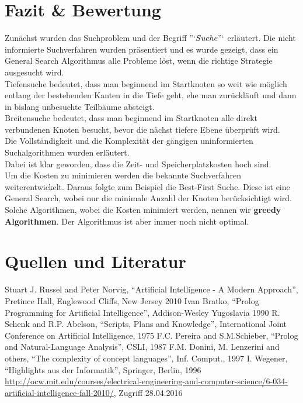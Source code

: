 \newpage
\section{Fazit \& Bewertung}

Zunächst wurden das Suchproblem und der Begriff $"`Suche"`$ erläutert. Die nicht informierte Suchverfahren wurden präsentiert und es wurde gezeigt, dass ein General Search Algorithmus alle Probleme löst, wenn die richtige Strategie ausgesucht wird. \\

Tiefensuche bedeutet, dass man beginnend im Startknoten so weit wie möglich entlang der bestehenden Kanten in die Tiefe geht, ehe man zurückläuft und dann in bislang unbesuchte Teilbäume absteigt.\\

 Breitensuche bedeutet, dass man beginnend im Startknoten alle direkt verbundenen Knoten besucht, bevor die nächst tiefere Ebene überprüft wird.\\

Die Vollständigkeit und die Komplexität der gängigen uninformierten Suchalgorithmen wurden erläutert.\\

Dabei ist klar geworden, dass die Zeit- und Speicherplatzkosten hoch sind. \\

Um die Kosten zu minimieren werden die bekannte Suchverfahren weiterentwickelt. Daraus folgte zum Beispiel die Best-First Suche. Diese ist eine General Search, wobei nur die minimale Anzahl der Knoten berücksichtigt wird.\\  Solche Algorithmen, wobei die Kosten minimiert werden, nennen wir \textbf{greedy Algorithmen}. Der Algorithmus ist aber immer noch nicht optimal.\\

\newpage
\section{Quellen und Literatur}

\begin{thebibliography}{999}
 Stuart J. Russel and Peter Norvig, “Artificial Intelligence - A Modern Approach”, Pretince Hall, Englewood Cliffs, New Jersey 2010
 Ivan Bratko, “Prolog Programming for Artificial Intelligence”, Addison-Wesley Yugoslavia 1990
 R. Schenk and R.P. Abelson, “Scripts, Plans and Knowledge”, International Joint Conference on Artificial Intelligence, 1975
 F.C. Pereira and S.M.Schieber, “Prolog and Natural-Language Analysis”, CSLI, 1987
 F.M. Donini, M. Lenzerini and others, “The complexity of concept languages”, Inf. Comput., 1997
 I. Wegener, “Highlights aus der Informatik”, Springer, Berlin, 1996
 \url{http://ocw.mit.edu/courses/electrical-engineering-and-computer-science/6-034-artificial-intelligence-fall-2010/}, Zugriff 28.04.2016
\end{thebibliography}
